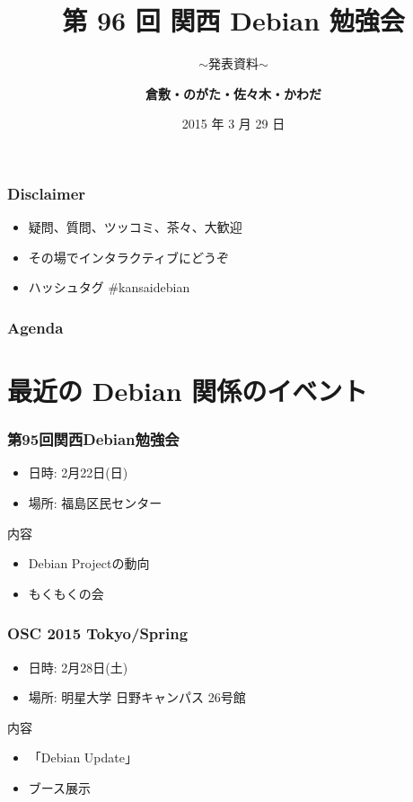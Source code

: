 \documentclass[cjk,dvipdfmx,10pt,compress,%
hyperref={bookmarks=true,bookmarksnumbered=true,bookmarksopen=false,%
colorlinks=false,%
pdftitle={第 96 回 関西 Debian 勉強会},%
pdfauthor={倉敷・のがた・佐々木・かわだ},%
pdfsubject={資料},%
}]{beamer}
\title{第 96 回 関西 Debian 勉強会}
\subtitle{$\sim$発表資料$\sim$}
\author[かわだ てつたろう]{{\large\bf 倉敷・のがた・佐々木・かわだ}}
\institute[Debian JP]{{\normalsize\tt 関西 Debian 勉強会}}
\date{{\small 2015 年 3 月 29 日}}
\begin{document}
\settitleslide
\begin{frame}
\titlepage
\end{frame}
\setdefaultslide

\begin{frame}[fragile]
  \frametitle{Disclaimer}
  \begin{itemize}
  \item 疑問、質問、ツッコミ、茶々、\alert{大歓迎}
  \item その場でインタラクティブにどうぞ
  \item ハッシュタグ \#kansaidebian
\end{itemize}
\end{frame}

\begin{frame}[fragile]
\frametitle{Agenda}

\tableofcontents

\end{frame}

\section{最近の Debian 関係のイベント}


\begin{frame}[fragile]
  \frametitle{第95回関西Debian勉強会}
  \begin{itemize}
  \item 日時: 2月22日(日)
  \item 場所: 福島区民センター
  \end{itemize}
  \begin{block}{内容}
    \begin{itemize}
    \item Debian Projectの動向
    \item もくもくの会
    \end{itemize}
  \end{block}
\end{frame}

\begin{frame}[fragile]
  \frametitle{OSC 2015 Tokyo/Spring}
  \begin{itemize}
  \item 日時: 2月28日(土)
  \item 場所: 明星大学 日野キャンパス 26号館
  \end{itemize}
  \begin{block}{内容}
    \begin{itemize}
    \item 「Debian Update」
    \item ブース展示
    \end{itemize}
  \end{block}
\end{frame}
\end{document}
